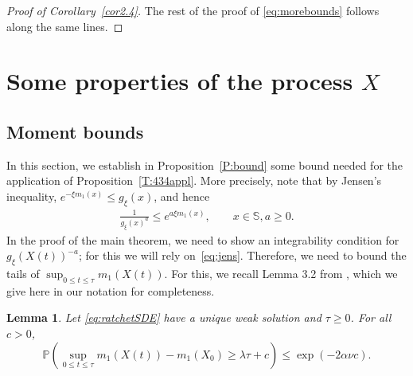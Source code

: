 \documentclass{imsart}
\theoremstyle{plain}
\newtheorem{lemma}[theorem]{Lemma}
\theoremstyle{definition}
\begin{document}
\begin{proof}[Proof of Corollary~\ref{cor2.4}]
The rest of the proof of \eqref{eq:morebounds} follows along the same lines.
\end{proof}

\section{Some properties of the process $X$}
\label{S:propX}

\subsection{Moment bounds}
\label{ss:mombounds}
In this section, we establish in Proposition~\ref{P:bound} some bound needed for the application of Proposition~\ref{T:434appl}. More precisely, note that by Jensen's inequality, $e^{- \xi m_1(x)} \leq g_{\xi}(x)$, and hence
\begin{align}
    \label{eq:jens}
    \frac{1}{g_{ \xi}(x)^a} \leq e^{a \xi m_1(x)}, \qquad x \in \mathbb S, a \geq 0.
\end{align} In the proof of the main theorem, we need to show an integrability condition for $g_\xi(X(t))^{-a}$; for this we will rely on~\eqref{eq:jens}. 
Therefore, we need to bound the tails of $\sup_{0 \leq t \leq \tau} m_1(X(t))$.
For this, we recall Lemma 3.2 from \cite{audiffren2013muller}, which we give here in our notation for completeness.

\begin{lemma}\label{l:linear}
   Let \eqref{eq:ratchetSDE} have a unique weak solution and $\tau\geq 0$. For all $c>0$, 
  $$\mathbb P\left(\sup_{0 \leq t \leq \tau} m_1(X(t)) - m_1(X_0) \geq \lambda \tau + c\right) \leq \exp(-2\alpha \nu c).$$
\end{lemma}
\end{document}
